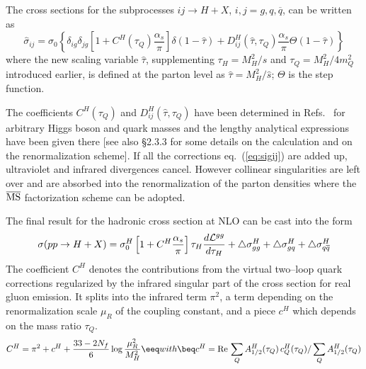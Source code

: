 The cross sections for the subprocesses $ij \rightarrow H + X$,
$i,j=g,q,\overline{q}$, can be written as
\begin{equation}
\hat\sigma_{ij} = \sigma_0 \left\{
\delta_{ig}\delta_{jg}\left[ 1+C^H (\tau_Q)\frac{\alpha_s}{\pi} \right]
\delta(1-\hat{\tau}) + D_{ij}^H (\hat{\tau},\tau_Q) \frac{\alpha_s}{\pi}
\Theta (1- \hat{\tau}) \right\}
\label{eq:sigij}
\end{equation}
where the new scaling variable $\hat{\tau}$, supplementing $\tau_H=M_H^2/s$ 
and $\tau_Q=M_H^2/4m_Q^2$ introduced earlier, is defined at the parton level as 
$\hat{\tau}=M^2_H/\hat{s}$; $\Theta$ is the step function.  \s

The coefficients $C^H(\tau_Q)$ and $D_{ij}^H (\hat{\tau},\tau_Q)$ have been
determined in Refs.~\cite{SDGZ,ggH-GSZ} for arbitrary Higgs boson and quark
masses and the lengthy analytical expressions have been given there [see also
\S2.3.3 for some details on the calculation and on the renormalization scheme].
If all the corrections eq.~(\ref{eq:sigij}) are added up, ultraviolet and
infrared divergences cancel.  However collinear singularities are left over and
are absorbed into the renormalization of the parton densities
\cite{DYNLO,pp-APabs} where the $\overline{\rm MS}$ factorization scheme can be
adopted. \s

The final result  for the hadronic cross section at NLO can be cast into the 
form
\begin{equation}
\sigma(pp\rightarrow H +X)=\sigma_0^H
         \left[
            1+C^H \frac{\alpha_s}{\pi}
         \right] \tau_H
         \frac{d{\cal L}^{gg}}{d\tau_H}
         +\triangle \sigma_{gg}^H
         +\triangle \sigma_{gq}^H
         +\triangle \sigma_{q \overline{q}}^H
\end{equation}
The coefficient $C^H$ denotes the  contributions from the virtual two--loop
quark corrections regularized by the infrared singular part of the cross
section for real gluon emission. It splits into the infrared term $\pi^2$, a 
term depending on the renormalization scale $\mu_R$ of the coupling constant, 
and a piece $c^H$ which depends on the mass ratio $\tau_Q$.
\begin{eqnarray}
C^H = \pi^2 + c^H + \frac{33-2 N_f}{6} \log \frac{\mu_R^2}{M^2_H } 
\eeq
\vspace*{-2mm}
with
\vspace*{-2mm}
\beq
c^H =  {\rm Re}\, \sum_Q A_{1/2}^H (\tau_Q) \, c^H_Q (\tau_Q) / 
\sum_Q A_{1/2}^H (\tau_Q)
\end{eqnarray}

